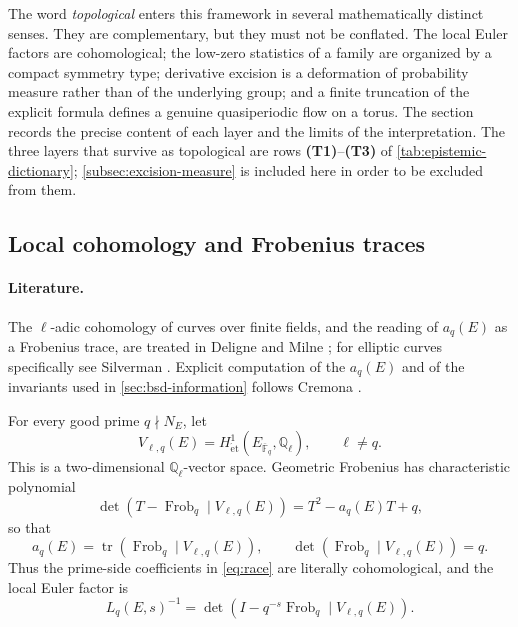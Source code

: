 \documentclass[11pt,reqno]{amsart}
\theoremstyle{remark}
\newcommand{\Q}{\mathbb{Q}}
\newcommand{\Fq}{\mathbb{F}}
\begin{document}
The word \emph{topological} enters this framework in several mathematically distinct senses.  They are complementary, but they must not be conflated.  The local Euler factors are cohomological; the low-zero statistics of a family are organized by a compact symmetry type; derivative excision is a deformation of probability measure rather than of the underlying group; and a finite truncation of the explicit formula defines a genuine quasiperiodic flow on a torus.  The section records the precise content of each layer and the limits of the interpretation.  The three layers that survive as topological are rows \textbf{(T1)}--\textbf{(T3)} of \cref{tab:epistemic-dictionary}; \cref{subsec:excision-measure} is included here in order to be excluded from them.

\subsection{Local cohomology and Frobenius traces}
\label{subsec:local-cohomology}

\paragraph{Literature.}
The $\ell$-adic cohomology of curves over finite fields, and the reading of $a_q(E)$ as a Frobenius trace, are treated in Deligne \cite{Deligne1974} and Milne \cite{Milne1980}; for elliptic curves specifically see Silverman \cite[Ch.~V]{Silverman2009}.  Explicit computation of the $a_q(E)$ and of the invariants used in \cref{sec:bsd-information} follows Cremona \cite{Cremona1997}.

For every good prime $q\nmid N_E$, let
\begin{equation}
  V_{\ell,q}(E)
  =H^1_{\mathrm{\acute et}}
  (E_{\overline{\Fq}_q},\Q_\ell),
  \qquad \ell\ne q.
\end{equation}
This is a two-dimensional $\Q_\ell$-vector space.  Geometric Frobenius has characteristic polynomial
\begin{equation}
  \det\!\left(T-\operatorname{Frob}_q\mid V_{\ell,q}(E)\right)
  =T^2-a_q(E)T+q,
  \label{eq:frobenius-characteristic-polynomial}
\end{equation}
so that
\begin{equation}
  a_q(E)
  =\operatorname{tr}\!\left(
  \operatorname{Frob}_q\mid V_{\ell,q}(E)
  \right),
  \qquad
  \det\!\left(
  \operatorname{Frob}_q\mid V_{\ell,q}(E)
  \right)=q.
  \label{eq:frobenius-trace}
\end{equation}
Thus the prime-side coefficients in \eqref{eq:race} are literally cohomological, and the local Euler factor is
\begin{equation}
  L_q(E,s)^{-1}
  =\det\!\left(
  I-q^{-s}\operatorname{Frob}_q
  \mid V_{\ell,q}(E)
  \right).
  \label{eq:local-factor-cohomology}
\end{equation}
\end{document}
